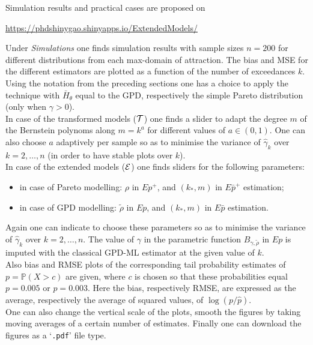 Simulation results and practical cases are proposed on
 
\url{https://phdshinygao.shinyapps.io/ExtendedModels/}
 
 \vspace{0.3cm}\noindent
Under {\it Simulations} one finds simulation results with sample sizes $n= 200$ for different distributions from each max-domain of attraction. The bias and MSE for the different estimators are plotted as a function of the number of exceedances $k$. 
Using the notation from the preceding sections one has a choice to apply the technique with $\bar{H}_{\theta}$ equal to the GPD, respectively the simple Pareto distribution (only when $\gamma>0$). \\

\noindent 
In case of the transformed models (${\cal T}$) one finds a slider to adapt the degree $m$ of the Bernstein polynoms along $m=k^a$ for different values of $a \in (0,1)$. One can also choose $a$ adaptively per sample so as to minimise the variance of $\hat{\gamma}_k$ over $k=2,\ldots,n$ (in order to have stable plots over $k$).
 \\
 
 \noindent
In case of the extended models (${\cal E}$) one finds sliders for the following parameters:
\begin{itemize}
\item in case of Pareto modelling: $\rho$ in $Ep^+$, and $(k_*,m)$ in $E{\bar p}^+$ estimation;
\item in case of GPD modelling: $\tilde\rho$ in $Ep$, and $(k_*,m)$ in $E{\bar p}$ estimation.
\end{itemize}
Again one can indicate to choose these parameters so as to minimise the variance of $\hat{\gamma}_k$ over $k=2,\ldots,n$. 
 The value of $\gamma$ in the parametric function $B_{\gamma,\tilde\rho}$ in $Ep$ is imputed with the classical GPD-ML estimator at the given value of $k$.
\\

\noindent 
Also bias and RMSE plots of the corresponding tail probability estimates of $p=\mathbb{P}(X>c)$ are given, where $c$ is chosen so that these probabilities equal $p=0.005$ or $p=0.003$. Here the bias, respectively RMSE, are expressed as the average, respectively the average of squared values, of $\log (p/\hat{p})$. 
 \\ 
 
One can also change the vertical scale of the plots, smooth the figures by taking moving averages of a certain number of estimates. Finally one can download the figures as a `\verb|.pdf|' file type. \\
 
